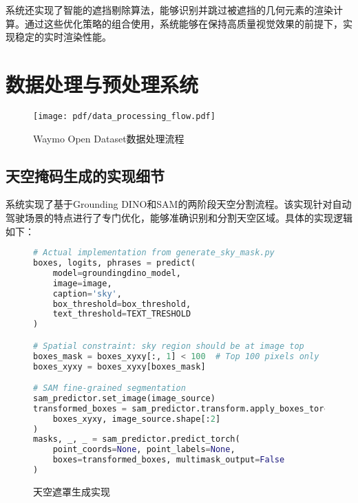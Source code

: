 系统还实现了智能的遮挡剔除算法，能够识别并跳过被遮挡的几何元素的渲染计算。通过这些优化策略的组合使用，系统能够在保持高质量视觉效果的前提下，实现稳定的实时渲染性能。

\section{数据处理与预处理系统}

\begin{figure}[htbp]
  \centering
  \texttt{[image: pdf/data\_processing\_flow.pdf]}
  \caption{Waymo Open Dataset数据处理流程}
  \label{fig:data-processing-flow}
\end{figure}

\subsection{天空掩码生成的实现细节}

系统实现了基于Grounding DINO和SAM的两阶段天空分割流程。该实现针对自动驾驶场景的特点进行了专门优化，能够准确识别和分割天空区域。具体的实现逻辑如下：

\begin{figure}[!b]
  \begin{tmpbox}
    \begin{lstlisting}[language=Python]
# Actual implementation from generate_sky_mask.py
boxes, logits, phrases = predict(
    model=groundingdino_model, 
    image=image, 
    caption='sky', 
    box_threshold=box_threshold, 
    text_threshold=TEXT_TRESHOLD
)

# Spatial constraint: sky region should be at image top
boxes_mask = boxes_xyxy[:, 1] < 100  # Top 100 pixels only
boxes_xyxy = boxes_xyxy[boxes_mask]

# SAM fine-grained segmentation
sam_predictor.set_image(image_source)
transformed_boxes = sam_predictor.transform.apply_boxes_torch(
    boxes_xyxy, image_source.shape[:2]
)
masks, _, _ = sam_predictor.predict_torch(
    point_coords=None, point_labels=None,
    boxes=transformed_boxes, multimask_output=False
)
\end{lstlisting}
  \end{tmpbox}
  \caption{天空遮罩生成实现}
  \label{fig:sky-mask-code}
\end{figure}

